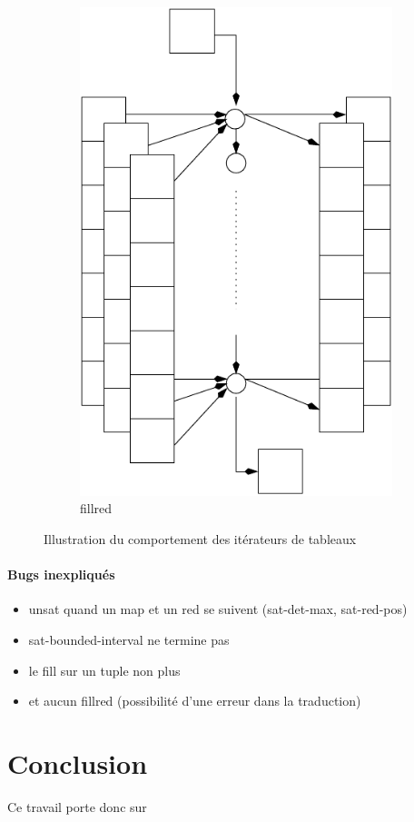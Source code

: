 \begin{figure}[t!]
\begin{subfigure}[t]{0.25\textwidth}
  \includegraphics[scale=0.45]{fig/mapred.pdf}
  \caption{fillred}
  \label{fig:fillred}
\end{subfigure}

\caption{Illustration du comportement des itérateurs de tableaux}
\end{figure}

\paragraph{Bugs inexpliqués}
\begin{itemize}
\item unsat quand un map et un red se suivent (sat-det-max, sat-red-pos)
\item sat-bounded-interval ne termine pas
\item le fill sur un tuple non plus
\item et aucun fillred (possibilité d'une erreur dans la traduction)
\end{itemize}

\section{Conclusion}
\label{section:conclusion}

Ce travail porte donc sur
